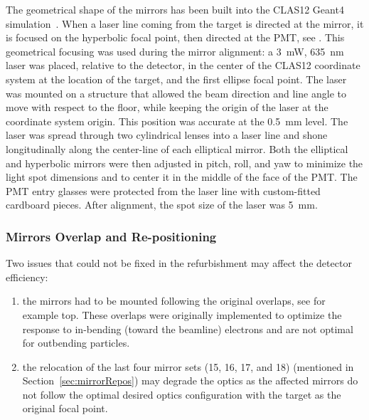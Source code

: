 The geometrical shape of the mirrors has been built into the CLAS12 Geant4 simulation~\cite{sim-nim}. When a laser line
coming from the target is directed at the mirror, it is focused on the hyperbolic focal point, then directed at the PMT,
see . This geometrical focusing was used during the mirror alignment: a 3~mW, 635~nm laser was
placed, relative to the detector, in the center of the CLAS12 coordinate system at the location of the target, and the first
ellipse focal point. The laser was mounted on a structure that allowed the beam direction and line angle to move with respect
to the floor, while keeping the origin of the laser at the coordinate system origin. This position was accurate at the 0.5~mm
level. The laser was spread through two cylindrical lenses into a laser line and shone longitudinally along the center-line of
each elliptical mirror. Both the elliptical and hyperbolic mirrors were then adjusted in pitch, roll, and yaw to minimize the
light spot dimensions and to center it in the middle of the face of the PMT. The PMT entry glasses were protected from
the laser line with custom-fitted cardboard pieces. After alignment, the spot size of the laser was 5~mm.

\subsubsection{Mirrors Overlap and Re-positioning}
\label{sec:possibleInefficiency}

Two issues that could not be fixed in the refurbishment may affect the detector efficiency:

\begin{enumerate}
  \item the mirrors had to be mounted following the original overlaps, see for example  top.
    These overlaps were originally implemented to optimize the response to in-bending (toward the beamline) electrons
    and are not optimal for outbending particles.
  \item the relocation of the last four mirror sets (15, 16, 17, and 18) (mentioned in Section~\ref{sec:mirrorRepos})
    may degrade the optics as the affected mirrors do not follow the optimal desired optics configuration with the
    target as the original focal point.
\end{enumerate}

